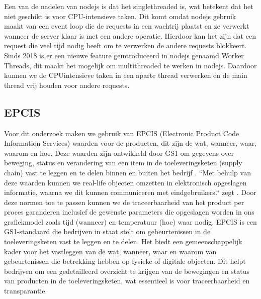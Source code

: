 Een van de nadelen van nodejs is dat het single\-threaded is, wat betekent dat het niet geschikt is voor CPU-intensieve taken.
Dit komt omdat nodejs gebruik maakt van een event loop die de requests in een wachtrij plaatst en ze verwerkt wanneer de server klaar is met een andere operatie.
Hierdoor kan het zijn dat een request die veel tijd nodig heeft om te verwerken de andere requests blokkeert.
Sinds 2018 is er een nieuwe feature geïntroduceerd in nodejs genaamd Worker Threads, dit maakt het mogelijk om multi\-threaded te werken in nodejs.
Daardoor kunnen we de CPU\-intensieve taken in een aparte thread verwerken en de main thread vrij houden voor andere requests.

\subsection{EPCIS}
Voor dit onderzoek maken we gebruik van EPCIS (Electronic Product Code Information Services) waarden voor de producten, dit zijn de wat, wanneer, waar, waarom en hoe. 
Deze waarden zijn ontwikkeld door GS1 om gegevens over beweging, status en verandering van een item in de toeleveringsketen (supply chain) vast te leggen en te delen binnen en buiten het bedrijf \autocite{Devins}.
``Met behulp van deze waarden kunnen we real-life objecten omzetten in elektronisch opgeslagen informatie, waarna we dit kunnen communiceren met eindgebruikers.`` zegt \textcite{Devins}.
Door deze normen toe te passen kunnen we de traceerbaarheid van het product per proces garanderen inclusief de gewenste parameters die opgeslagen worden in ons grafiekmodel zoals tijd (wanneer) en temperatuur (hoe) waar nodig.
EPCIS is een GS1-standaard die bedrijven in staat stelt om gebeurtenissen in de toeleveringsketen vast te leggen en te delen. Het biedt een gemeenschappelijk kader voor het vastleggen van de wat, wanneer, waar en waarom van gebeurtenissen die betrekking hebben op fysieke of digitale objecten. Dit helpt bedrijven om een gedetailleerd overzicht te krijgen van de bewegingen en status van producten in de toeleveringsketen, wat essentieel is voor traceerbaarheid en transparantie.


